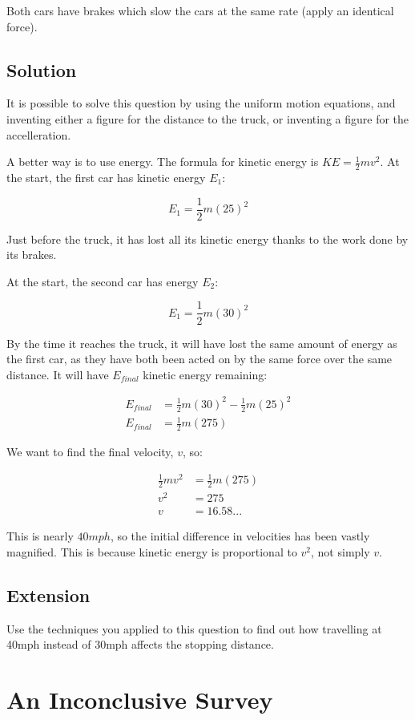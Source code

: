 \documentclass{book}
\begin{document}
Both cars have brakes which slow the cars at the same rate (apply an identical force).
\subsection{Solution}
It is possible to solve this question by using the uniform motion equations, and inventing either a figure for the distance to the truck, or inventing a figure for the accelleration.

A better way is to use energy. The formula for kinetic energy is \(KE=\frac{1}{2}mv^2\). At the start, the first car has kinetic energy \(E_1\):

\[E_1=\frac{1}{2}m(25)^2\]

Just before the truck, it has lost all its kinetic energy thanks to the work done by its brakes.

At the start, the second car has energy \(E_2\):

\[E_1=\frac{1}{2}m(30)^2\]

By the time it reaches the truck, it will have lost the same amount of energy as the first car, as they have both been acted on by the same force over the same distance. It will have \(E_{final}\) kinetic energy remaining:

\begin{align*}
  E_{final}&=\frac{1}{2}m(30)^2-\frac{1}{2}m(25)^2\\
  E_{final}&=\frac{1}{2}m(275)
\end{align*}


We want to find the final velocity, \(v\), so:

\begin{align*}
  \frac{1}{2}mv^2&=\frac{1}{2}m(275)\\
  v^2&=275\\
  v&=\boxed{16.58...}
\end{align*}


This is nearly \(40mph\), so the initial difference in velocities has been vastly magnified. This is because kinetic energy is proportional to \(v^2\), not simply \(v\).

\subsection{Extension}
Use the techniques you applied to this question to find out how travelling at 40mph instead of 30mph affects the stopping distance.
\newpage

\section{An Inconclusive Survey}
\end{document}
